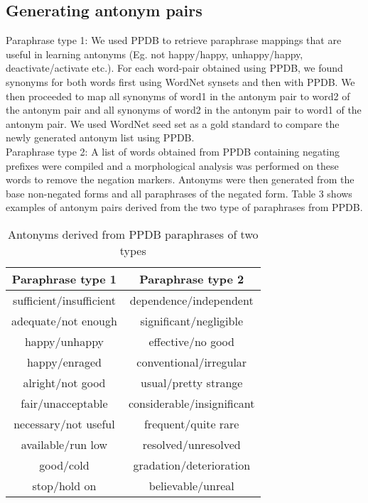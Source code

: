 \documentclass[11pt]{article}
\begin{document}
\subsection{Generating antonym pairs}
Paraphrase type 1:  We used PPDB to retrieve paraphrase mappings that are useful in learning antonyms (Eg. not happy/happy, unhappy/happy, deactivate/activate etc.). For each word-pair obtained using PPDB, we found synonyms for both words first using WordNet synsets and then with PPDB. We then proceeded to map all synonyms of word1 in the antonym pair to word2 of the antonym pair and all synonyms of word2 in the antonym pair to word1 of the antonym pair. We used WordNet seed set as a gold standard to compare the newly generated antonym list using PPDB.\\
Paraphrase type 2: A list of words obtained from PPDB containing negating prefixes were compiled and a morphological analysis was performed on these words to remove the negation markers. Antonyms were then generated from the base non-negated forms and all paraphrases of the negated form.
Table 3 shows examples of antonym pairs derived from the two type of paraphrases from PPDB.
\begin{table}
\begin{tabular}[t]{|c|c|}
\hline
Paraphrase type 1 & Paraphrase type 2\\
\hline \hline
sufficient/insufficient & dependence/independent\\
adequate/not enough & significant/negligible\\
happy/unhappy & effective/no good\\
happy/enraged & conventional/irregular\\
alright/not good & usual/pretty strange\\
fair/unacceptable & considerable/insignificant\\
necessary/not useful & frequent/quite rare\\
available/run low & resolved/unresolved\\
good/cold & gradation/deterioration\\
stop/hold on & believable/unreal\\
 \hline
\end{tabular}
\caption {Antonyms derived from PPDB paraphrases of two types}
\end{table}
\end{document}
